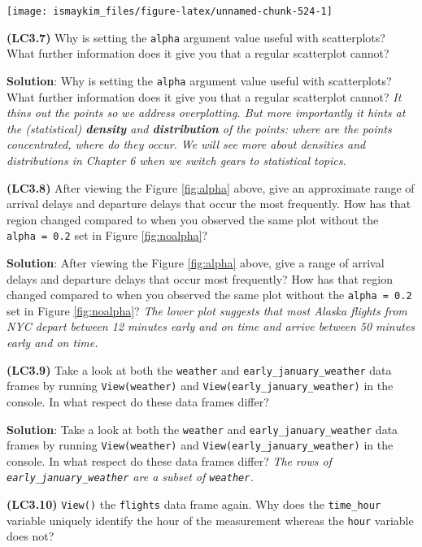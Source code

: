 \documentclass[12pt,]{krantz}
\begin{document}
\begin{center}\texttt{[image: ismaykim\_files/figure-latex/unnamed-chunk-524-1]} \end{center}

\textbf{(LC3.7)} Why is setting the \texttt{alpha} argument value useful
with scatterplots? What further information does it give you that a
regular scatterplot cannot?

\textbf{Solution}: Why is setting the \texttt{alpha} argument value
useful with scatterplots? What further information does it give you that
a regular scatterplot cannot? \emph{It thins out the points so we
address overplotting. But more importantly it hints at the (statistical)
\textbf{density} and \textbf{distribution} of the points: where are the
points concentrated, where do they occur. We will see more about
densities and distributions in Chapter 6 when we switch gears to
statistical topics.}

\textbf{(LC3.8)} After viewing the Figure \ref{fig:alpha} above, give an
approximate range of arrival delays and departure delays that occur the
most frequently. How has that region changed compared to when you
observed the same plot without the \texttt{alpha\ =\ 0.2} set in Figure
\ref{fig:noalpha}?

\textbf{Solution}: After viewing the Figure \ref{fig:alpha} above, give
a range of arrival delays and departure delays that occur most
frequently? How has that region changed compared to when you observed
the same plot without the \texttt{alpha\ =\ 0.2} set in Figure
\ref{fig:noalpha}? \emph{The lower plot suggests that most Alaska
flights from NYC depart between 12 minutes early and on time and arrive
between 50 minutes early and on time.}

\textbf{(LC3.9)} Take a look at both the \texttt{weather} and
\texttt{early\_january\_weather} data frames by running
\texttt{View(weather)} and \texttt{View(early\_january\_weather)} in the
console. In what respect do these data frames differ?

\textbf{Solution}: Take a look at both the \texttt{weather} and
\texttt{early\_january\_weather} data frames by running
\texttt{View(weather)} and \texttt{View(early\_january\_weather)} in the
console. In what respect do these data frames differ? \emph{The rows of
\texttt{early\_january\_weather} are a subset of \texttt{weather}.}

\textbf{(LC3.10)} \texttt{View()} the \texttt{flights} data frame again.
Why does the \texttt{time\_hour} variable uniquely identify the hour of
the measurement whereas the \texttt{hour} variable does not?
\end{document}

